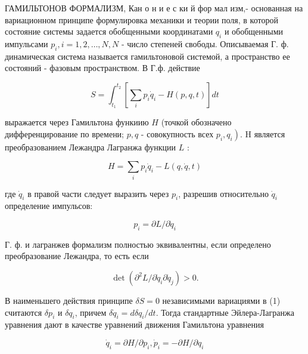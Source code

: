 \documentclass[10pt]{article}
\begin{document}
ГАМИЛЬТОНОВ ФОРМАЛИЗМ, Кан о н и е с ки й фор мал изм,- основанная на вариационном принципе формулировка механики и теории поля, в которой состояние системы задается обобщенными координатами $q_{i}$ и обобщенными импульсами $p_{i}, i=1,2, \ldots, N, N$ - число степеней свободы. Описываемая Г. ф. динамическая система называется гамильтоновой системой, а пространство ее состояний - фазовым пространством. В Г.ф. действие



\[

S=\int_{t_{1}}^{t_{2}}\left[\sum_{i} p_{i} \dot{q}_{i}-H(p, q, t)\right] d t

\]



выражается через Гамильтона функиию $H$ (точкой обозначено дифференцирование по времени; $p, q$ - совокупность всех $\left.p_{i}, q_{i}\right)$. H является преобразованием Лежандра Лагранжа функции $L$ :



\[

H=\sum_{i} p_{i} \dot{q}_{i}-L(q, \dot{q}, t)

\]



где $\dot{q}_{i}$ в правой части следует выразить через $p_{i}$, разрешив относительно $\dot{q}_{i}$ определение импульсов:



\[

p_{i}=\partial L / \partial \dot{q}_{i}

\]



Г. ф. и лагранжев формализм полностью эквивалентны, если определено преобразование Лежандра, то есть если



\[

\operatorname{det}\left(\partial^{2} L / \partial \dot{q}_{i} \partial \dot{q}_{j}\right)>0 .

\]



В наименьшего действия принципе $\delta S=0$ независимыми вариациями в (1) считаются $\delta p_{i}$ и $\delta q_{i}$, причем $\delta \dot{q}_{i}=d \delta q_{i} / d t$. Тогда стандартные Эйлера-Лагранжа уравнения дают в качестве уравнений движения Гамильтона уравнения



\[

\dot{q}_{i}=\partial H / \partial p_{i}, \dot{p}_{i}=-\partial H / \partial q_{i}

\]
\end{document}
